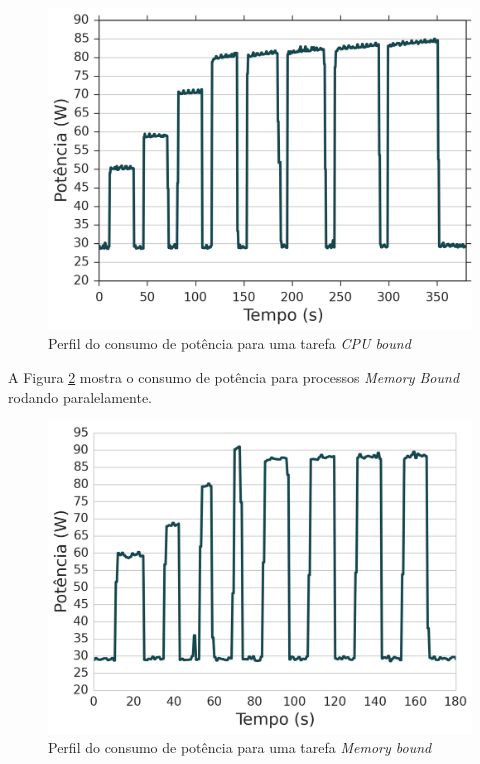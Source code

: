 \begin{figure}[htp]
\centering
\includegraphics[scale=0.70]{figuras/Exper/PerfPot/cpubound.png}
\caption{Perfil do consumo de potência para uma tarefa \emph{CPU bound}}
\label{perf_pot_cpu_bound_png}
\end{figure}


A Figura \ref{perf_pot_mem_bound_png} mostra o consumo de potência para processos \emph{Memory Bound} rodando paralelamente.
\begin{figure}[htp]
\centering
\includegraphics[scale=0.70]{figuras/Exper/PerfPot/membound.png}
\caption{Perfil do consumo de potência para uma tarefa \emph{Memory bound}}
\label{perf_pot_mem_bound_png}
\end{figure}


